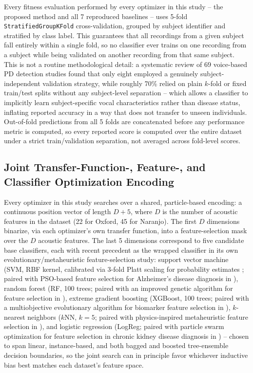 Every fitness evaluation performed by every optimizer in this study --
the proposed method and all 7 reproduced baselines -- uses 5-fold
\texttt{StratifiedGroupKFold} cross-validation, grouped by subject
identifier and stratified by class label. This guarantees that all
recordings from a given subject fall entirely within a single fold, so no
classifier ever trains on one recording from a subject while being
validated on another recording from that same subject. This is not a
routine methodological detail: a systematic review of 69 voice-based PD
detection studies found that only eight employed a genuinely
subject-independent validation strategy, while roughly 70\% relied on
plain $k$-fold or fixed train/test splits without any subject-level
separation \cite{SedighMalekroodi:2025} -- which allows a classifier to
implicitly learn subject-specific vocal characteristics rather than
disease status, inflating reported accuracy in a way that does not
transfer to unseen individuals. Out-of-fold predictions from all 5 folds
are concatenated before any performance metric is computed, so every
reported score is computed over the entire dataset under a strict
train/validation separation, not averaged across fold-level scores.

\subsection{Joint Transfer-Function-, Feature-, and Classifier Optimization Encoding}
\label{sec:3.3}

Every optimizer in this study searches over a shared, particle-based
encoding: a continuous position vector of length $D + 5$, where $D$ is
the number of acoustic features in the dataset (22 for Oxford, 45 for
Naranjo). The first $D$ dimensions binarize, via each optimizer's own
transfer function, into a feature-selection mask over the $D$ acoustic
features. The last 5 dimensions correspond to five candidate base
classifiers, each with recent precedent as the wrapped classifier in its
own evolutionary/metaheuristic feature-selection study: support vector
machine (SVM, RBF kernel, calibrated via 3-fold Platt scaling for
probability estimates \cite{Platt:1999}; paired with PSO-based feature
selection for Alzheimer's disease diagnosis in \cite{Zhang:2025}), random
forest (RF, 100 trees; paired with an improved genetic algorithm for
feature selection in \cite{Ding:2025}), extreme gradient boosting
(XGBoost, 100 trees; paired with a multiobjective evolutionary algorithm
for biomarker feature selection in \cite{Panagiotopoulos:2023}),
$k$-nearest neighbors ($k$NN, $k=5$; paired with physics-inspired
metaheuristic feature selection in \cite{Priyadarshini:2023}), and
logistic regression (LogReg; paired with particle swarm optimization for
feature selection in chronic kidney disease diagnosis in
\cite{Mishra:2025}) -- chosen to span linear, instance-based, and both
bagged and boosted tree-ensemble decision boundaries, so the joint search
can in principle favor whichever inductive bias best matches each
dataset's feature space.

